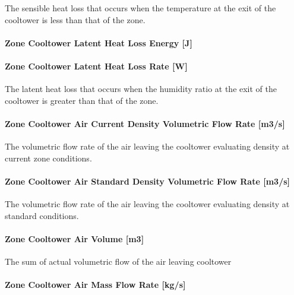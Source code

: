 The sensible heat loss that occurs when the temperature at the exit of the cooltower is less than that of the zone.

\paragraph{Zone Cooltower Latent Heat Loss Energy {[}J{]}}\label{zone-cooltower-latent-heat-loss-energy-j}

\paragraph{Zone Cooltower Latent Heat Loss Rate {[}W{]}}\label{zone-cooltower-latent-heat-loss-rate-w}

The latent heat loss that occurs when the humidity ratio at the exit of the cooltower is greater than that of the zone.

\paragraph{Zone Cooltower Air Current Density Volumetric Flow Rate {[}m3/s{]}}\label{zone-cooltower-air-current-density-volumetric-flow-rate-m3s}

The volumetric flow rate of the air leaving the cooltower evaluating density at current zone conditions.

\paragraph{Zone Cooltower Air Standard Density Volumetric Flow Rate {[}m3/s{]}}\label{zone-cooltower-air-standard-density-volumetric-flow-rate-m3s}

The volumetric flow rate of the air leaving the cooltower evaluating density at standard conditions.

\paragraph{Zone Cooltower Air Volume {[}m3{]}}\label{zone-cooltower-air-volume-m3}

The sum of actual volumetric flow of the air leaving cooltower

\paragraph{Zone Cooltower Air Mass Flow Rate {[}kg/s{]}}\label{zone-cooltower-air-mass-flow-rate-kgs}

